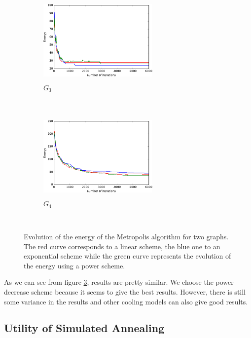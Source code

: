\documentclass[a4paper]{article}
\begin{document}
\begin{figure}[H]
    \begin{subfigure}[b]{0.45\textwidth}
        \includegraphics[width=2.3in, height=1.7in]{../Plots/SimulatedAnnealing/H_G3.pdf}
        \caption{$G_3$}
        \label{fig:g3}
    \end{subfigure}
    ~ %
    \begin{subfigure}[b]{0.45\textwidth}
        \includegraphics[width=2.3in, height=1.7in]{../Plots/SimulatedAnnealing/H_G4.pdf}
        \caption{$G_4$}
        \label{fig:g4}
    \end{subfigure}
    ~ %
    \caption{Evolution of the energy of the Metropolis algorithm for two graphs. The red curve corresponds to a linear scheme, the blue one to an exponential scheme while the green curve represents the evolution of the energy using a power scheme.}
    \label{fig:comparison}
\end{figure}

As we can see from figure \ref{fig:comparison}, results are pretty similar. We choose the power decrease scheme because it seems to give the best results. However, there is still some variance in the results and other cooling models can also give good results.

\subsection{Utility of Simulated Annealing}
\end{document}
